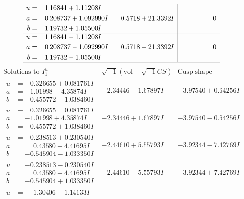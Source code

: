 \documentclass[1p]{elsarticle_modified}
\theoremstyle{definition}
\newcommand{\I}{\sqrt{-1}}
\begin{document}
$$\begin{array}{c|c|c}
\begin{aligned}
u &= \phantom{-}1.16841 + 1.11208 I \\
a &= \phantom{-}0.208737 + 1.092990 I \\
b &= \phantom{-}1.19732 + 1.05500 I\end{aligned}
 & \phantom{-}0.5718 + 21.3392 I & \phantom{-0.000000 } 0 \\ \hline\begin{aligned}
u &= \phantom{-}1.16841 - 1.11208 I \\
a &= \phantom{-}0.208737 - 1.092990 I \\
b &= \phantom{-}1.19732 - 1.05500 I\end{aligned}
 & \phantom{-}0.5718 - 21.3392 I & \phantom{-0.000000 } 0\\
 \hline 
 \end{array}$$\newpage$$\begin{array}{c|c|c}  
\text{Solutions to }I^u_{1}& \I (\text{vol} + \sqrt{-1}CS) & \text{Cusp shape}\\
 \hline 
\begin{aligned}
u &= -0.326655 + 0.081761 I \\
a &= -1.01998 - 4.35874 I \\
b &= -0.455772 - 1.038460 I\end{aligned}
 & -2.34446 - 1.67897 I & -3.97540 + 0.64256 I \\ \hline\begin{aligned}
u &= -0.326655 - 0.081761 I \\
a &= -1.01998 + 4.35874 I \\
b &= -0.455772 + 1.038460 I\end{aligned}
 & -2.34446 + 1.67897 I & -3.97540 - 0.64256 I \\ \hline\begin{aligned}
u &= -0.238513 + 0.230540 I \\
a &= \phantom{-}0.43580 - 4.41695 I \\
b &= -0.545904 - 1.033350 I\end{aligned}
 & -2.44610 + 5.55793 I & -3.92344 - 7.42769 I \\ \hline\begin{aligned}
u &= -0.238513 - 0.230540 I \\
a &= \phantom{-}0.43580 + 4.41695 I \\
b &= -0.545904 + 1.033350 I\end{aligned}
 & -2.44610 - 5.55793 I & -3.92344 + 7.42769 I \\ \hline\begin{aligned}
u &= \phantom{-}1.30406 + 1.14133 I \\

\end{aligned}
\end{array}$$
\end{document}
